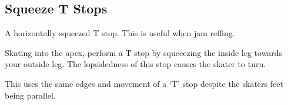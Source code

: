 \subsection*{Squeeze T Stops}
\label{drill:t_stop:squeeze}

A horizontally squeezed T stop. 
This is useful when jam reffing.


Skating into the apex, perform a T stop by squeeezing the inside leg towards your outside leg.  
The lopsidedness of this stop causes the skater to turn.

This uses the same edges and movement of a `T' stop despite the skaters feet being parallel.

